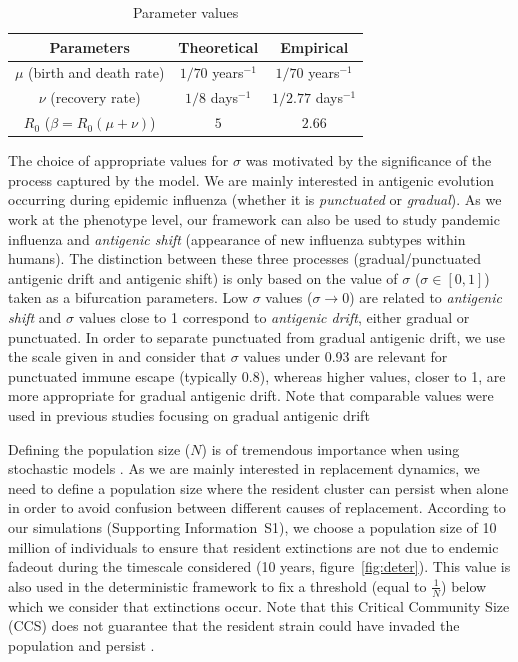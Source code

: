 \begin{table}[!htbp]
  \caption{Parameter values}
  \begin{footnotesize}
    \begin{tabular}{|c|c|c|}
      \hline
      Parameters & Theoretical & Empirical\\
      \hline
      $\mu$ (birth and death rate) & $1/70$ years$^{-1} $ \cite{Goekaydin2007} & $1/70$ years$^{-1}$ \cite{Goekaydin2007}\\
      \hline
      $\nu$ (recovery rate) & $1/8$ days$^{-1}$ \cite{Koelle2006} & $1/2.77$ days$^{-1}$ \cite{Lavenu2004} \\
      \hline	
      $R_0$ ($\beta=R_0 (\mu+\nu)$) & $5$ \cite{Koelle2006} & $2.66$ \cite{Lavenu2004} \\
      \hline		
    \end{tabular}
  \end{footnotesize}
  \label{tab:param}
\end{table}


The choice of appropriate values for $\sigma$ was motivated by the
significance of the process captured by the model. We are mainly
interested in antigenic evolution occurring during epidemic influenza
(whether it is \textit{punctuated} or \textit{gradual}). As we work at
the phenotype level, our framework can also be used to study pandemic
influenza and \textit{antigenic shift} (appearance of new influenza
subtypes within humans). The distinction between these three processes
(gradual/punctuated antigenic drift and antigenic shift) is only based
on the value of $\sigma$ ($\sigma \in [0,1]$) taken as a bifurcation
parameters. Low $\sigma$ values ($\sigma \to 0$) are related to
\emph{antigenic shift} and $\sigma$ values close to 1 correspond to
\emph{antigenic drift}, either gradual or punctuated.
%
In order to separate punctuated from gradual antigenic drift, we use
the scale given in \citet{Koelle2006} and consider that $\sigma$
values under 0.93 are relevant for punctuated immune escape (typically
0.8), whereas higher values, closer to 1, are more appropriate for
gradual antigenic drift. Note that comparable values were used in
previous studies focusing on gradual antigenic drift \citep{Gog2002,
  Ferguson2003}

Defining the population size ($N$) is of tremendous importance when
using stochastic models \citep{Bartlett1957, Bartlett1960,
  Bartlett1964, Keeling1997a, Naasell2005}. As we are mainly
interested in replacement dynamics, we need to define a population
size where the resident cluster can persist when alone in order to
avoid confusion between different causes of replacement. According to
our simulations (Supporting Information~S1), we choose a population size of 10 million
of individuals to ensure that resident extinctions are not due to
endemic fadeout during the timescale considered (10 years,
figure~\ref{fig:deter}). This value is also used in the deterministic
framework to fix a threshold (equal to $\frac{1}{N}$) below which we
consider that extinctions occur. Note that this Critical Community
Size (CCS) \citep{Lloyd-Smith2005} does not guarantee that the
resident strain could have invaded the population and persist
\citep{Conlan2007}.


